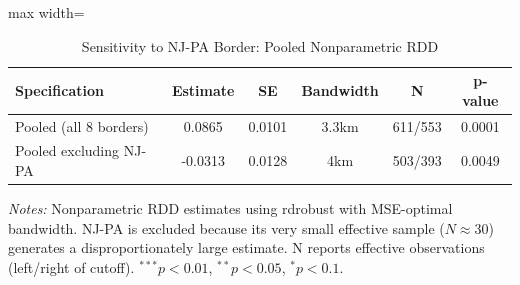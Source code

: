 \begin{table}[htbp]
\centering
\caption{Sensitivity to NJ-PA Border: Pooled Nonparametric RDD}
\label{tab:excl_njpa}
\begin{adjustbox}{max width=\textwidth}
\begin{tabular}{lccccc}
  \hline
Specification & Estimate & SE & Bandwidth & N & p-value \\ 
  \hline
Pooled (all 8 borders) & 0.0865 & 0.0101 & 3.3km & 611/553 & 0.0001 \\ 
  Pooled excluding NJ-PA & -0.0313 & 0.0128 & 4km & 503/393 & 0.0049 \\ 
   \hline
\end{tabular}
\end{adjustbox}
\begin{tablenotes}\small
\item \textit{Notes:} Nonparametric RDD estimates using rdrobust with MSE-optimal bandwidth. NJ-PA is excluded because its very small effective sample ($N \approx 30$) generates a disproportionately large estimate. N reports effective observations (left/right of cutoff). $^{***}p<0.01$, $^{**}p<0.05$, $^{*}p<0.1$.
\end{tablenotes}
\end{table}
